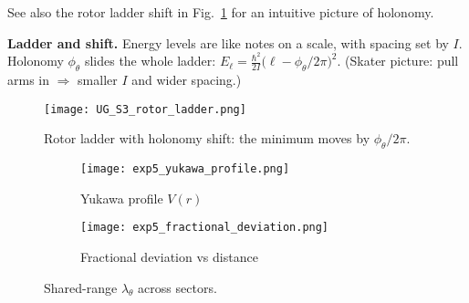 See also the rotor ladder shift in Fig.~\ref{fig:ug-rotor} for an intuitive picture of holonomy.

\begin{idea}
                  	\textbf{Ladder and shift.} Energy levels are like notes on a scale, with spacing set by $I$. Holonomy $\phi_\theta$ slides the whole ladder:
$E_\ell=\tfrac{\hbar^2}{2I}\bigl(\ell-\phi_\theta/2\pi\bigr)^2$. (Skater picture: pull arms in $\Rightarrow$ smaller $I$ and wider spacing.)
\end{idea}

\begin{figure}[htbp]
  \centering
  \texttt{[image: UG\_S3\_rotor\_ladder.png]}
  \caption{Rotor ladder with holonomy shift: the minimum moves by $\phi_\theta/2\pi$.}
  \label{fig:ug-rotor}
\end{figure}

\begin{figure}[htbp]
  \centering
  \begin{subfigure}[b]{0.48\linewidth}
    \centering
    \texttt{[image: exp5\_yukawa\_profile.png]}
    \caption{Yukawa profile $V(r)$}
    \label{fig:yukawa-profile}
  \end{subfigure}\hfill
  \begin{subfigure}[b]{0.48\linewidth}
    \centering
    \texttt{[image: exp5\_fractional\_deviation.png]}
    \caption{Fractional deviation vs distance}
    \label{fig:yukawa-deviation}
  \end{subfigure}
  \caption{Shared-range $\lambda_\theta$ across sectors.}
  \label{fig:yukawa}
\end{figure}
